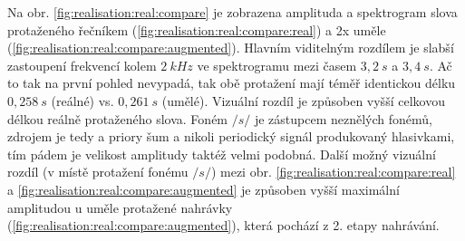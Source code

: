 Na obr. \ref{fig:realisation:real:compare} je zobrazena amplituda a spektrogram slova  protaženého řečníkem (\ref{fig:realisation:real:compare:real}) a 2x uměle (\ref{fig:realisation:real:compare:augmented}). Hlavním viditelným rozdílem je slabší zastoupení frekvencí kolem $2\ kHz$ ve spektrogramu mezi časem $3,2\ s$ a $3,4\ s$. Ač to tak na první pohled nevypadá, tak obě protažení mají téměř identickou délku $0,258\ s$ (reálné) vs. $0,261\ s$ (umělé). Vizuální rozdíl je způsoben vyšší celkovou délkou reálně protaženého slova. Foném $/s/$ je zástupcem neznělých fonémů, zdrojem je tedy a priory šum a nikoli periodický signál produkovaný hlasivkami, tím pádem je velikost amplitudy taktéž velmi podobná. Další možný vizuální rozdíl (v místě protažení fonému $/s/$) mezi obr. \ref{fig:realisation:real:compare:real} a \ref{fig:realisation:real:compare:augmented} je způsoben vyšší maximální amplitudou u uměle protažené nahrávky (\ref{fig:realisation:real:compare:augmented}), která pochází z 2. etapy nahrávání.

